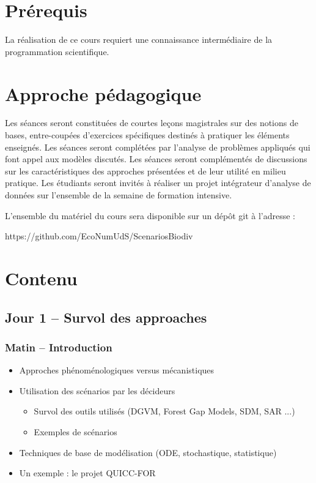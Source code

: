 \documentclass[12]{article}
\begin{document}
	\section*{Prérequis}

	La réalisation de ce cours requiert une connaissance intermédiaire de la
	programmation scientifique.


  \section*{Approche pédagogique}

Les séances seront constituées de courtes leçons magistrales sur des notions de bases, entre-coupées d’exercices spécifiques destinés à pratiquer les éléments enseignés. Les séances seront complétées par l'analyse de problèmes appliqués qui font appel aux modèles discutés. Les séances seront complémentés de discussions sur les caractéristiques des approches présentées et de leur utilité en milieu pratique. Les étudiants seront invités à réaliser un projet intégrateur d’analyse de données sur l’ensemble de la semaine de formation intensive.

L’ensemble du matériel du cours sera disponible sur un dépôt git à l’adresse :

https://github.com/EcoNumUdS/ScenariosBiodiv


	\section*{Contenu}

  \subsection*{Jour 1 -- Survol des approaches}
  \subsubsection*{Matin -- Introduction}
  \begin{itemize}
    \item Approches phénoménologiques versus mécanistiques
    \item Utilisation des scénarios par les décideurs
    \begin{itemize}
      \item Survol des outils utilisés (DGVM, Forest Gap Models, SDM, SAR ...)
      \item Exemples de scénarios
    \end{itemize}
    \item Techniques de base de modélisation (ODE, stochastique, statistique)
    \item Un exemple : le projet QUICC-FOR
  \end{itemize}
\end{document}
